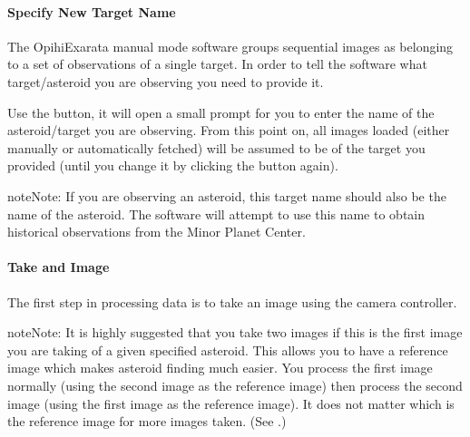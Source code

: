 \documentclass[letterpaper,11pt,english]{sphinxmanual}
\begin{document}
\paragraph{Specify New Target Name}
\label{\detokenize{user/manual_mode:specify-new-target-name}}\label{\detokenize{user/manual_mode:user-manual-mode-procedure-specify-new-target-name}}
\sphinxAtStartPar
The OpihiExarata manual mode software groups sequential images as belonging to
a set of observations of a single target. In order to tell the software what
target/asteroid you are observing you need to provide it.

\sphinxAtStartPar
Use the  button, it will open a small prompt for you to enter the
name of the asteroid/target you are observing. From this point on, all images
loaded (either manually or automatically fetched) will be assumed to be of the
target you provided (until you change it by clicking the button again).

\begin{sphinxadmonition}{note}{Note:}
\sphinxAtStartPar
If you are observing an asteroid, this target name should also be the name
of the asteroid. The software will attempt to use this name to obtain
historical observations from the Minor Planet Center.
\end{sphinxadmonition}


\paragraph{Take and Image}
\label{\detokenize{user/manual_mode:take-and-image}}
\sphinxAtStartPar
The first step in processing data is to take an image using the camera
controller.

\begin{sphinxadmonition}{note}{Note:}
\sphinxAtStartPar
It is highly suggested that you take two images if this is the first image
you are taking of a given specified asteroid. This allows you to have a
reference image which makes asteroid finding much easier. You process the
first image normally (using the second image as the reference image) then
process the second image (using the first image as the reference image).
It does not matter which is the reference image for more images taken. (See
{\hyperref[\detokenize{user/manual_mode:user-manual-mode-procedure-find-asteroid-location}]{}}.)
\end{sphinxadmonition}
\end{document}
